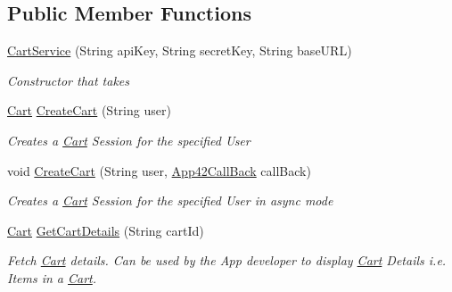\subsection*{Public Member Functions}
\begin{DoxyCompactItemize}
\item 
\hyperlink{classcom_1_1shephertz_1_1app42_1_1paas_1_1sdk_1_1csharp_1_1shopping_1_1_cart_service_acd783ee66d5ed50ac98c40252920f24b}{Cart\+Service} (String api\+Key, String secret\+Key, String base\+U\+R\+L)
\begin{DoxyCompactList}\small\item\em Constructor that takes \end{DoxyCompactList}\item 
\hyperlink{classcom_1_1shephertz_1_1app42_1_1paas_1_1sdk_1_1csharp_1_1shopping_1_1_cart}{Cart} \hyperlink{classcom_1_1shephertz_1_1app42_1_1paas_1_1sdk_1_1csharp_1_1shopping_1_1_cart_service_a8267edf4fa76e8c868a1ca04895db941}{Create\+Cart} (String user)
\begin{DoxyCompactList}\small\item\em Creates a \hyperlink{classcom_1_1shephertz_1_1app42_1_1paas_1_1sdk_1_1csharp_1_1shopping_1_1_cart}{Cart} Session for the specified User \end{DoxyCompactList}\item 
void \hyperlink{classcom_1_1shephertz_1_1app42_1_1paas_1_1sdk_1_1csharp_1_1shopping_1_1_cart_service_a6e28b51e5c948885ec432381f414992d}{Create\+Cart} (String user, \hyperlink{interfacecom_1_1shephertz_1_1app42_1_1paas_1_1sdk_1_1csharp_1_1_app42_call_back}{App42\+Call\+Back} call\+Back)
\begin{DoxyCompactList}\small\item\em Creates a \hyperlink{classcom_1_1shephertz_1_1app42_1_1paas_1_1sdk_1_1csharp_1_1shopping_1_1_cart}{Cart} Session for the specified User in async mode \end{DoxyCompactList}\item 
\hyperlink{classcom_1_1shephertz_1_1app42_1_1paas_1_1sdk_1_1csharp_1_1shopping_1_1_cart}{Cart} \hyperlink{classcom_1_1shephertz_1_1app42_1_1paas_1_1sdk_1_1csharp_1_1shopping_1_1_cart_service_a246351b145e8081bfcdfc316f2d7de86}{Get\+Cart\+Details} (String cart\+Id)
\begin{DoxyCompactList}\small\item\em Fetch \hyperlink{classcom_1_1shephertz_1_1app42_1_1paas_1_1sdk_1_1csharp_1_1shopping_1_1_cart}{Cart} details. Can be used by the App developer to display \hyperlink{classcom_1_1shephertz_1_1app42_1_1paas_1_1sdk_1_1csharp_1_1shopping_1_1_cart}{Cart} Details i.\+e. Items in a \hyperlink{classcom_1_1shephertz_1_1app42_1_1paas_1_1sdk_1_1csharp_1_1shopping_1_1_cart}{Cart}. \end{DoxyCompactList}\item 

\end{DoxyCompactItemize}
